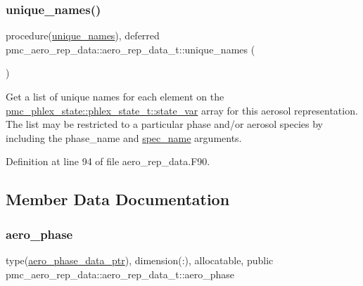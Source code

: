 \subsubsection{\texorpdfstring{unique\+\_\+names()}{unique\_names()}}
{\footnotesize\ttfamily procedure(\mbox{\hyperlink{interfacepmc__aero__rep__data_1_1unique__names}{unique\+\_\+names}}), deferred pmc\+\_\+aero\+\_\+rep\+\_\+data\+::aero\+\_\+rep\+\_\+data\+\_\+t\+::unique\+\_\+names (\begin{DoxyParamCaption}{ }\end{DoxyParamCaption})\hspace{0.3cm}{\ttfamily [private]}}



Get a list of unique names for each element on the {\ttfamily \mbox{\hyperlink{structpmc__phlex__state_1_1phlex__state__t_a78835cb552d483ebbfc7a6bc6f756918}{pmc\+\_\+phlex\+\_\+state\+::phlex\+\_\+state\+\_\+t\+::state\+\_\+var}}} array for this aerosol representation. The list may be restricted to a particular phase and/or aerosol species by including the phase\+\_\+name and \mbox{\hyperlink{interfacepmc__aero__rep__data_1_1spec__name}{spec\+\_\+name}} arguments. 



Definition at line 94 of file aero\+\_\+rep\+\_\+data.\+F90.



\subsection{Member Data Documentation}
\mbox{\label{structpmc__aero__rep__data_1_1aero__rep__data__t_ad377561864accd479058d9fefe85469f}} 
\subsubsection{\texorpdfstring{aero\+\_\+phase}{aero\_phase}}
{\footnotesize\ttfamily type(\mbox{\hyperlink{structpmc__aero__phase__data_1_1aero__phase__data__ptr}{aero\+\_\+phase\+\_\+data\+\_\+ptr}}), dimension(\+:), allocatable, public pmc\+\_\+aero\+\_\+rep\+\_\+data\+::aero\+\_\+rep\+\_\+data\+\_\+t\+::aero\+\_\+phase}



